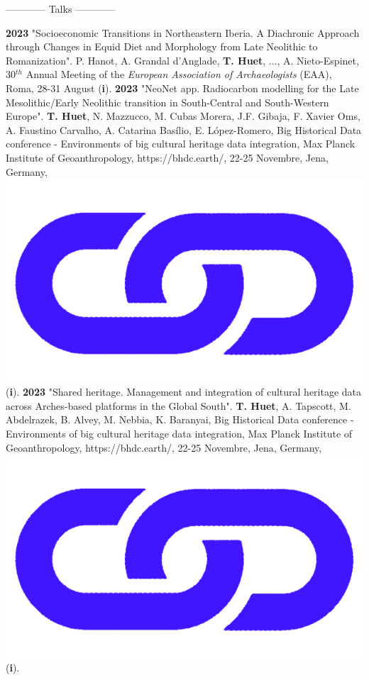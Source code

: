 \documentclass{article}
\newcommand{\fr}[1]{} %
\newcommand{\en}[1]{#1}   %
\begin{document}
{\begin{center}
\fr{------------ Communications ------------}
\en{------------ Talks ------------}
\end{center}
\smallbreak
\textbf{2023 }"Socioeconomic Transitions in Northeastern Iberia. A Diachronic Approach through Changes in Equid Diet and Morphology from Late Neolithic to Romanization". P. Hanot, A. Grandal d'Anglade, \textbf{T. Huet}, ..., A. Nieto-Espinet, 30${}^{th}$ Annual Meeting of the \textit{European Association of Archaeologists} (EAA), Roma, 28-31 August (\textbf{i}).
\smallbreak
\textbf{2023 }"NeoNet app. Radiocarbon modelling for the Late Mesolithic/Early Neolithic transition in South-Central and South-Western Europe". \textbf{T. Huet}, N. Mazzucco, M. Cubas Morera, J.F. Gibaja, F. Xavier Oms, A. Faustino Carvalho, A. Catarina Basílio, E. López-Romero, Big Historical Data conference - Environments of big cultural heritage data integration, Max Planck Institute of Geoanthropology, https://bhdc.earth/, 22-25 Novembre, Jena, Germany,  \href{https://zoometh.github.io/neonet/doc/talks/2023-bhdc}{\includegraphics[scale=0.02]{link_darkblue.png}} (\textbf{i}).
\smallbreak
\textbf{2023 }"Shared heritage. Management and integration of cultural heritage data across Arches-based platforms in the Global South". \textbf{T. Huet}, A. Tapscott, M. Abdelrazek, B. Alvey, M. Nebbia, K. Baranyai, Big Historical Data conference - Environments of big cultural heritage data integration, Max Planck Institute of Geoanthropology, https://bhdc.earth/, 22-25 Novembre, Jena, Germany,  \href{https://colab.research.google.com/github/achp-project/cultural-heritage/blob/main/presentation/bhdc/rm_compar.ipynb}{\includegraphics[scale=0.02]{link_darkblue.png}} (\textbf{i}).
}
\end{document}
